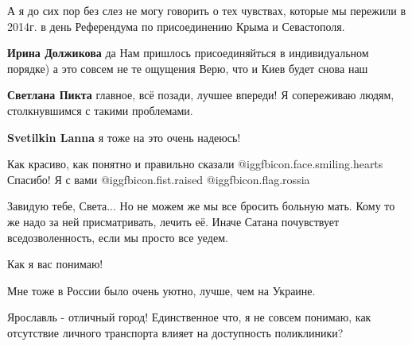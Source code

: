 \begin{itemize}

А я до сих пор без слез не могу говорить о тех чувствах, которые мы пережили в
2014г. в день Референдума по присоединению Крыма и Севастополя.

\begin{itemize} %
\textbf{Ирина Должикова} да
Нам пришлось присоединяйться в индивидуальном порядке) а это совсем не те ощущения
Верю, что и Киев будет снова наш

\textbf{Светлана Пикта} главное, всё позади, лучшее впереди! Я сопереживаю людям, столкнувшимся с такими проблемами.

\textbf{Svetilkin Lanna} я тоже на это очень надеюсь!
\end{itemize} %


Как красиво, как понятно и правильно сказали 
@igg{fbicon.face.smiling.hearts} Спасибо! Я с вами @igg{fbicon.fist.raised} @igg{fbicon.flag.rossia}


Завидую тебе, Света... Но не можем же мы все бросить больную мать. Кому то же
надо за ней присматривать, лечить её. Иначе Сатана почувствует
вседозволенность, если мы просто все уедем.

Как я вас понимаю!

Мне тоже в России было очень уютно, лучше, чем на Украине.


Ярославль - отличный город! Единственное что, я не совсем понимаю, как
отсутствие личного транспорта влияет на доступность поликлиники?

\end{itemize} %
